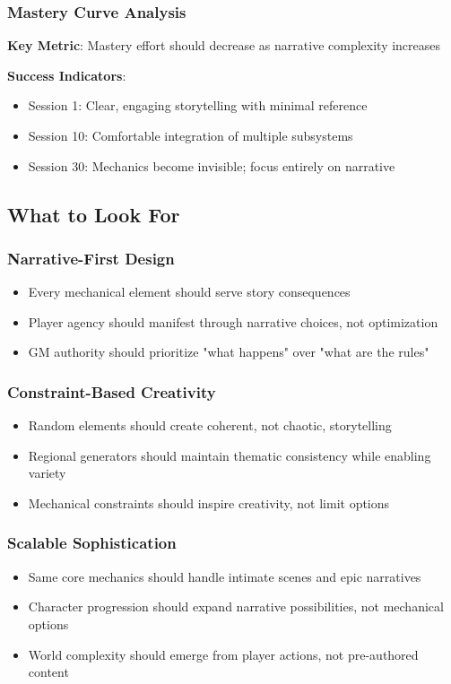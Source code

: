 \subsubsection{Mastery Curve Analysis}
\textbf{Key Metric}: Mastery effort should decrease as narrative complexity increases

\textbf{Success Indicators}:
\begin{itemize}
    \item Session 1: Clear, engaging storytelling with minimal reference
    \item Session 10: Comfortable integration of multiple subsystems
    \item Session 30: Mechanics become invisible; focus entirely on narrative
\end{itemize}

\subsection{What to Look For}

\subsubsection{Narrative-First Design}
\begin{itemize}
    \item Every mechanical element should serve story consequences
    \item Player agency should manifest through narrative choices, not optimization
    \item GM authority should prioritize "what happens" over "what are the rules"
\end{itemize}

\subsubsection{Constraint-Based Creativity}
\begin{itemize}
    \item Random elements should create coherent, not chaotic, storytelling
    \item Regional generators should maintain thematic consistency while enabling variety
    \item Mechanical constraints should inspire creativity, not limit options
\end{itemize}

\subsubsection{Scalable Sophistication}
\begin{itemize}
    \item Same core mechanics should handle intimate scenes and epic narratives
    \item Character progression should expand narrative possibilities, not mechanical options
    \item World complexity should emerge from player actions, not pre-authored content
\end{itemize}

